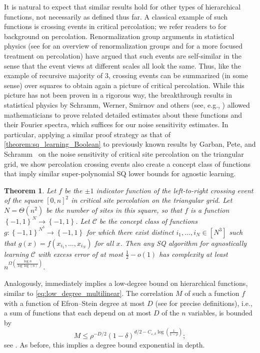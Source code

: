 \documentclass[12pt,letterpaper]{amsart}
\newcommand{\mc}[1]{\mathcal{#1}}
\newcommand{\set}[1]{\left\{#1\right\}}
\newcommand{\paren}[1]{\left(#1\right)}
\newcommand{\bracket}[1]{\left[#1\right]}
\newcommand{\1}[1]{1_{\left\{#1\right\}}}
\newtheorem{theorem}{Theorem}[section]
\theoremstyle{definition}
\theoremstyle{remark}
\begin{document}
It is natural to expect that similar results hold for other types of hierarchical functions, not necessarily as defined thus far.
A classical example of such functions is crossing events in critical percolation; we refer readers to \cite{Grimmett} for background on percolation.
Renormalization group arguments in statistical physics (see \cite{bauerschmidt2019renormalization} for an overview of renormalization groups and \cite{stauffer1992introduction} for a more focused treatment on percolation) have argued that such events are self-similar in the sense that the event views at different scales all look the same.
Thus, like the example of recursive majority of $3$, crossing events can be summarized (in some sense) over squares to obtain again a picture of critical percolation.
While this picture has not been proven in a rigorous way, the breakthrough results in statistical physics by Schramm, Werner, Smirnov and others (see, e.g., \cite{schramm2000sle,smirnov2001critical,werner2001critical}) allowed mathematicians to prove related detailed estimates about these functions and their Fourier spectra, which suffices for our noise sensitivity estimates.
In particular, applying a similar proof strategy as that of \cref{theorem:sq_learning_Boolean} to previously known results by Garban, Pete, and Schramm~\cite{garban2010fourier} on the noise sensitivity of critical site percolation on the triangular grid, we show percolation crossing events also create a concept class of functions that imply similar super-polynomial SQ lower bounds for agnostic learning.
\begin{theorem}\label{theorem:sq_learning_percolation}
    Let $f$ be the $\pm1$ indicator function of the left-to-right crossing event of the square $[0,n]^2$ in critical site percolation on the triangular grid.
    Let $N=\Theta(n^2)$ be the number of sites in this square, so that $f$ is a function $\set{-1,1}^N\to\set{-1,1}$.
    Let $\mc C$ be the concept class of functions $g:\set{-1,1}^{N^3}\to\set{-1,1}$ for which there exist distinct $i_1,\dots,i_N\in\bracket{N^3}$ such that $g(x)=f(x_{i_1},\dots,x_{i_N})$ for all $x$.
    Then any SQ algorithm for agnostically learning $\mc C$ with excess error of at most $\frac{1}{2}-o(1)$ has complexity at least $n^{\Omega\paren{\frac{\log n}{\log\log(n)}}}$.
\end{theorem}

Analogously,  immediately implies a low-degree bound on hierarchical functions, similar to \eqref{eq:low_degree_multilinear}.
The correlation $M$ of such a function $f$ with a function of Efron--Stein degree at most $D$ (see  for precise definitions), i.e., a sum of functions that each depend on at most $D$ of the $n$ variables, is bounded by
\begin{equation}\label{eq:low_degree_general}
    M \leq \rho^{-D/2}(1-\delta)^{d/2-C_{\varepsilon,\delta}\log\paren{\frac{1}{1-\rho}}};
\end{equation}
see .
As before, this implies a degree bound exponential in depth.
\end{document}

